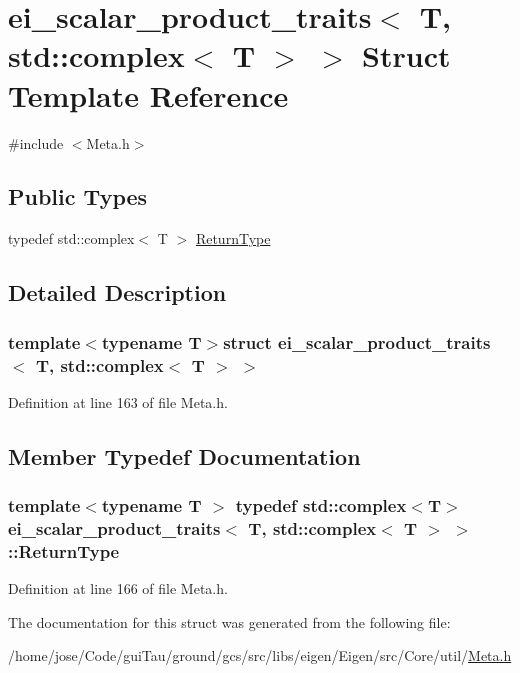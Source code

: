 \hypertarget{structei__scalar__product__traits_3_01_t_00_01std_1_1complex_3_01_t_01_4_01_4}{\section{ei\-\_\-scalar\-\_\-product\-\_\-traits$<$ T, std\-:\-:complex$<$ T $>$ $>$ Struct Template Reference}
\label{structei__scalar__product__traits_3_01_t_00_01std_1_1complex_3_01_t_01_4_01_4}
}


{\ttfamily \#include $<$Meta.\-h$>$}

\subsection*{Public Types}
\begin{DoxyCompactItemize}
\item 
typedef std\-::complex$<$ T $>$ \hyperlink{structei__scalar__product__traits_3_01_t_00_01std_1_1complex_3_01_t_01_4_01_4_a911ed4612668ef876e98edffd34458c9}{Return\-Type}
\end{DoxyCompactItemize}


\subsection{Detailed Description}
\subsubsection*{template$<$typename T$>$struct ei\-\_\-scalar\-\_\-product\-\_\-traits$<$ T, std\-::complex$<$ T $>$ $>$}



Definition at line 163 of file Meta.\-h.



\subsection{Member Typedef Documentation}
\hypertarget{structei__scalar__product__traits_3_01_t_00_01std_1_1complex_3_01_t_01_4_01_4_a911ed4612668ef876e98edffd34458c9}{
\subsubsection[{Return\-Type}]{\setlength{\rightskip}{0pt plus 5cm}template$<$typename T $>$ typedef std\-::complex$<$T$>$ {\bf ei\-\_\-scalar\-\_\-product\-\_\-traits}$<$ T, std\-::complex$<$ T $>$ $>$\-::{\bf Return\-Type}}}\label{structei__scalar__product__traits_3_01_t_00_01std_1_1complex_3_01_t_01_4_01_4_a911ed4612668ef876e98edffd34458c9}


Definition at line 166 of file Meta.\-h.



The documentation for this struct was generated from the following file\-:\begin{DoxyCompactItemize}
\item 
/home/jose/\-Code/gui\-Tau/ground/gcs/src/libs/eigen/\-Eigen/src/\-Core/util/\hyperlink{_meta_8h}{Meta.\-h}\end{DoxyCompactItemize}
